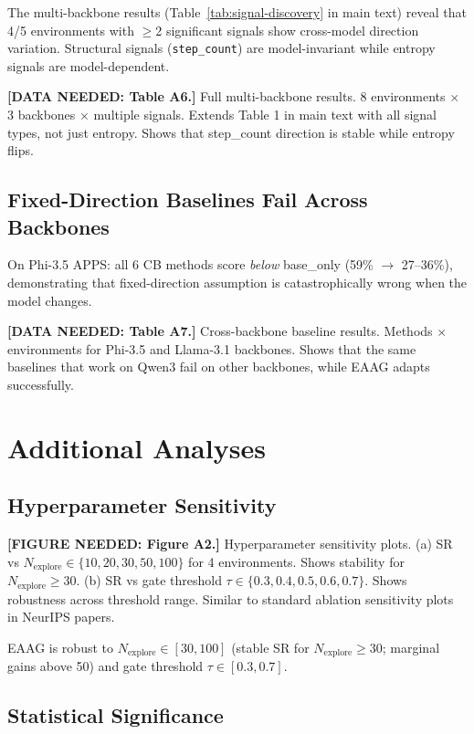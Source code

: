 The multi-backbone results (Table~\ref{tab:signal-discovery} in main text)
reveal that 4/5 environments with $\geq$2 significant signals show
cross-model direction variation. Structural signals
(\texttt{step\_count}) are model-invariant while entropy signals are
model-dependent.

{\color{blue} \textbf{[DATA NEEDED: Table A6.]} Full multi-backbone results.
8 environments $\times$ 3 backbones $\times$ multiple signals.
Extends Table 1 in main text with all signal types, not just entropy.
Shows that step\_count direction is stable while entropy flips.}

\subsection{Fixed-Direction Baselines Fail Across Backbones}

On Phi-3.5 APPS: all 6 CB methods score \emph{below} base\_only
(59\% $\to$ 27--36\%), demonstrating that fixed-direction assumption
is catastrophically wrong when the model changes.

{\color{blue} \textbf{[DATA NEEDED: Table A7.]} Cross-backbone baseline results.
Methods $\times$ environments for Phi-3.5 and Llama-3.1 backbones.
Shows that the same baselines that work on Qwen3 fail on other backbones,
while EAAG adapts successfully.}


\section{Additional Analyses}
\label{app:additional}

\subsection{Hyperparameter Sensitivity}

{\color{red} \textbf{[FIGURE NEEDED: Figure A2.]} Hyperparameter sensitivity plots.
(a) SR vs $N_{\text{explore}} \in \{10, 20, 30, 50, 100\}$ for 4 environments.
Shows stability for $N_{\text{explore}} \geq 30$.
(b) SR vs gate threshold $\tau \in \{0.3, 0.4, 0.5, 0.6, 0.7\}$.
Shows robustness across threshold range.
Similar to standard ablation sensitivity plots in NeurIPS papers.}

EAAG is robust to $N_{\text{explore}} \in [30, 100]$ (stable SR for
$N_{\text{explore}} \geq 30$; marginal gains above 50) and gate
threshold $\tau \in [0.3, 0.7]$.

\subsection{Statistical Significance}

